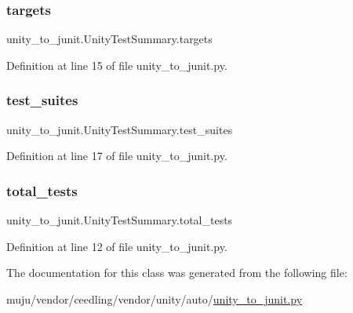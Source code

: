 \subsubsection{\texorpdfstring{targets}{targets}}
{\footnotesize\ttfamily unity\+\_\+to\+\_\+junit.\+Unity\+Test\+Summary.\+targets}



Definition at line 15 of file unity\+\_\+to\+\_\+junit.\+py.

\mbox{\label{classunity__to__junit_1_1_unity_test_summary_ae73ffcabd682b592454f35c230de4bf1}} 
\subsubsection{\texorpdfstring{test\+\_\+suites}{test\_suites}}
{\footnotesize\ttfamily unity\+\_\+to\+\_\+junit.\+Unity\+Test\+Summary.\+test\+\_\+suites}



Definition at line 17 of file unity\+\_\+to\+\_\+junit.\+py.

\mbox{\label{classunity__to__junit_1_1_unity_test_summary_a8af33e4fc6faed23b2a7035121a855e5}} 
\subsubsection{\texorpdfstring{total\+\_\+tests}{total\_tests}}
{\footnotesize\ttfamily unity\+\_\+to\+\_\+junit.\+Unity\+Test\+Summary.\+total\+\_\+tests}



Definition at line 12 of file unity\+\_\+to\+\_\+junit.\+py.



The documentation for this class was generated from the following file\+:\begin{DoxyCompactItemize}
\item 
muju/vendor/ceedling/vendor/unity/auto/\hyperlink{unity__to__junit_8py}{unity\+\_\+to\+\_\+junit.\+py}\end{DoxyCompactItemize}
